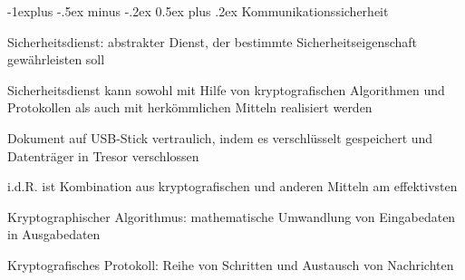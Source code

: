 \documentclass[a4paper]{article}
\makeatletter
\renewcommand{\subsection}{\@startsection{subsection}{2}{0mm}%
 {-1explus -.5ex minus -.2ex}%
 {0.5ex plus .2ex}%
 {\normalfont\normalsize\bfseries}}
\makeatother
\begin{document}
\begin{multicols}{3}
      \subsection{Kommunikationssicherheit}
      \begin{itemize*}
            \item Sicherheitsdienst: abstrakter Dienst, der bestimmte Sicherheitseigenschaft gewährleisten soll
            \item Sicherheitsdienst kann sowohl mit Hilfe von kryptografischen Algorithmen und Protokollen als auch mit herkömmlichen Mitteln realisiert werden
            \item Dokument auf USB-Stick vertraulich, indem es verschlüsselt gespeichert und Datenträger in Tresor verschlossen
            \item i.d.R. ist Kombination aus kryptografischen und anderen Mitteln am effektivsten
            \item Kryptographischer Algorithmus: mathematische Umwandlung von Eingabedaten in Ausgabedaten
            \item Kryptografisches Protokoll: Reihe von Schritten und Austausch von Nachrichten %
      \end{itemize*}


\end{multicols}
\end{document}

